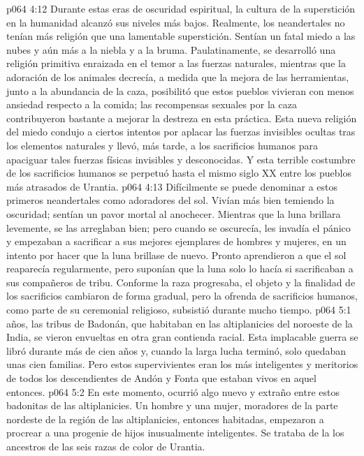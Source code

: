 \vs p064 4:12 \pc Durante estas eras de oscuridad espiritual, la cultura de la superstición en la humanidad alcanzó sus niveles más bajos. Realmente, los neandertales no tenían más religión que una lamentable superstición. Sentían un fatal miedo a las nubes y aún más a la niebla y a la bruma. Paulatinamente, se desarrolló una religión primitiva enraizada en el temor a las fuerzas naturales, mientras que la adoración de los animales decrecía, a medida que la mejora de las herramientas, junto a la abundancia de la caza, posibilitó que estos pueblos vivieran con menos ansiedad respecto a la comida; las recompensas sexuales por la caza contribuyeron bastante a mejorar la destreza en esta práctica. Esta nueva religión del miedo condujo a ciertos intentos por aplacar las fuerzas invisibles ocultas tras los elementos naturales y llevó, más tarde, a los sacrificios humanos para apaciguar tales fuerzas físicas invisibles y desconocidas. Y esta terrible costumbre de los sacrificios humanos se perpetuó hasta el mismo siglo XX entre los pueblos más atrasados de Urantia.
\vs p064 4:13 Difícilmente se puede denominar a estos primeros neandertales como adoradores del sol. Vivían más bien temiendo la oscuridad; sentían un pavor mortal al anochecer. Mientras que la luna brillara levemente, se las arreglaban bien; pero cuando se oscurecía, les invadía el pánico y empezaban a sacrificar a sus mejores ejemplares de hombres y mujeres, en un intento por hacer que la luna brillase de nuevo. Pronto aprendieron a que el sol reaparecía regularmente, pero suponían que la luna solo lo hacía si sacrificaban a sus compañeros de tribu. Conforme la raza progresaba, el objeto y la finalidad de los sacrificios cambiaron de forma gradual, pero la ofrenda de sacrificios humanos, como parte de su ceremonial religioso, subsistió durante mucho tiempo.
\vs p064 5:1  años, las tribus de Badonán, que habitaban en las altiplanicies del noroeste de la India, se vieron envueltas en otra gran contienda racial. Esta implacable guerra se libró durante más de cien años y, cuando la larga lucha terminó, solo quedaban unas cien familias. Pero estos supervivientes eran los más inteligentes y meritorios de todos los descendientes de Andón y Fonta que estaban vivos en aquel entonces.
\vs p064 5:2 En este momento, ocurrió algo nuevo y extraño entre estos badonitas de las altiplanicies. Un hombre y una mujer, moradores de la parte nordeste de la región de las altiplanicies, entonces habitadas, empezaron a procrear  a una progenie de hijos inusualmente inteligentes. Se trataba de la  los ancestros de las seis razas de color de Urantia.
